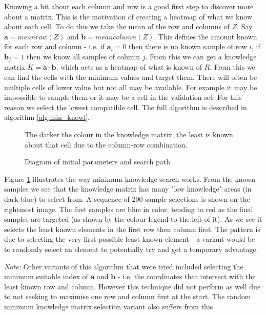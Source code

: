 Knowing a bit about each column and row is a good first step to discover more about a matrix. This is the motivation of creating a heatmap of what we know about each cell. To do this we take the mean of the row and columns of $Z$. Say $\mathbf{a}=meanrow(Z)$ and $\mathbf{b}=meancolumn(Z)$. This defines the amount known for each row and column - i.e. if $\mathbf{a}_i = 0$ then there is no known sample of row $i$, if $\mathbf{b}_j = 1$ then we know all samples of column $j$. From this we can get a knowledge matrix $K= \mathbf{a} \cdot \mathbf{b}$, which acts as a heatmap of what is known of $R$. From this we can find the cells with the minimum values and target them. There will often be multiple cells of lower value but not all may be available. For example it may be impossible to sample them or it may be a cell in the validation set. For this reason we select the lowest compatible cell. The full algorithm is described in algorithm \ref{alg:min_knowl}.

\begin{figure}[!htbp]
  \begin{center}
    \resizebox{\textwidth}{!}{}
  \end{center}
  The darker the colour in the knowledge matrix, the least is known about that cell due to the column-row combination.
    \caption{Diagram of initial parameters and search path}
    \label{fig:min_know_search}
\end{figure}

Figure \ref{fig:min_know_search} illustrates the way minimum knowledge search works. From the known samples we see that the knowledge matrix has many "low knowledge" areas (in dark blue) to select from. A sequence of 200 sample selections is shown on the rightmost image. The first samples are blue in color, tending to red as the final samples are targeted (as shown by the colour legend to the left of it). As we see it selects the least known elements in the first row then column first. The pattern is due to selecting the very first possible least known element - a variant would be to randomly select an element to potentially try and get a temporary advantage.

\textit{Note:} Other variants of this algorithm that were tried included selecting the minimum suitable index of $\mathbf{a}$ and $\mathbf{b}$ - i.e. the coordinates that intersect with the least known row and column. However this technique did not perform as well due to not seeking to maximise one row and column first at the start. The random minimum knowledge matrix selection variant also suffers from this.


